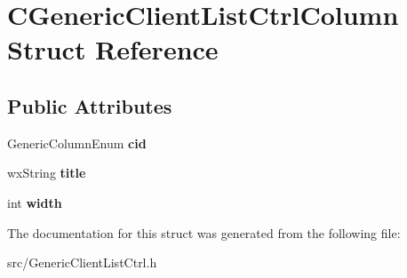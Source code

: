 \section{CGenericClientListCtrlColumn Struct Reference}
\label{structCGenericClientListCtrlColumn}
\subsection*{Public Attributes}
\begin{DoxyCompactItemize}
\item 
GenericColumnEnum {\bfseries cid}\label{structCGenericClientListCtrlColumn_aa5499f91bf2c8f4bfef4014a4bd88885}

\item 
wxString {\bfseries title}\label{structCGenericClientListCtrlColumn_a697577c45e229592be47ad3eec75e969}

\item 
int {\bfseries width}\label{structCGenericClientListCtrlColumn_a3dfa15a60209c2ec0af0702a92b2224a}

\end{DoxyCompactItemize}


The documentation for this struct was generated from the following file:\begin{DoxyCompactItemize}
\item 
src/GenericClientListCtrl.h\end{DoxyCompactItemize}
